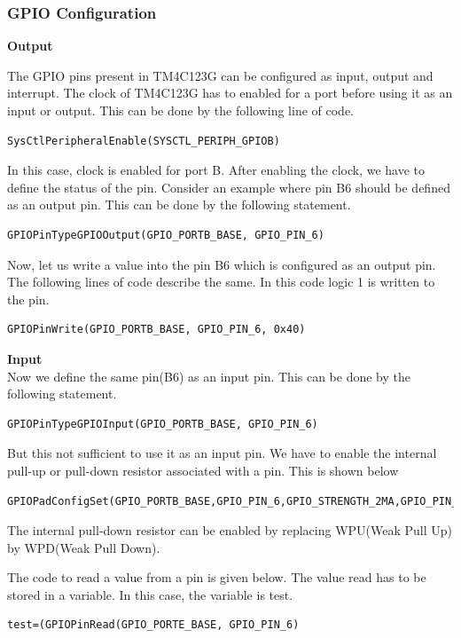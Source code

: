 \documentclass[a4paper,10pt,oneside]{article}
\begin{document}
{			\subsubsection{\textbf{GPIO Configuration}}
				\begin{itemize}
				\item \textbf{Output} \\
				{The GPIO pins present in TM4C123G can be configured as input, output and interrupt. The clock of TM4C123G has to enabled for a port before using it as an input or output. This can be done by the following line of code.
				\begin{lstlisting}[style=CStyle]
					SysCtlPeripheralEnable(SYSCTL_PERIPH_GPIOB)  \end{lstlisting}
				In this case, clock is enabled for port B. After enabling the clock, we have to define the status of the pin. Consider an example where pin B6 should be defined as an output pin. This can be done by the following statement.
				\begin{lstlisting}[style=CStyle]
				GPIOPinTypeGPIOOutput(GPIO_PORTB_BASE, GPIO_PIN_6)  \end{lstlisting}
				
				Now, let us write a value into the pin B6 which is configured as an output pin. The following lines of code describe the same. In this code logic 1 is written to the pin.
				\begin{lstlisting}[style=CStyle]
				GPIOPinWrite(GPIO_PORTB_BASE, GPIO_PIN_6, 0x40) \end{lstlisting}
				\item \textbf{Input}	\\
				Now we define the same pin(B6) as an input pin. This can be done by the following statement. 
				\begin{lstlisting}[style=CStyle]
				GPIOPinTypeGPIOInput(GPIO_PORTB_BASE, GPIO_PIN_6)  \end{lstlisting}
				But this not sufficient to use it as an input pin. We have to enable the internal pull-up or pull-down resistor associated with a pin. This is shown below
								\begin{lstlisting}[style=CStyle]
				GPIOPadConfigSet(GPIO_PORTB_BASE,GPIO_PIN_6,GPIO_STRENGTH_2MA,GPIO_PIN_TYPE_STD_WPU)  \end{lstlisting}
				The internal pull-down resistor can be enabled by replacing WPU(Weak Pull Up) by WPD(Weak Pull Down).
				
				The code to read a value from a pin is given below. The value read has to be stored in a variable. In this case, the variable is test.  
				\begin{lstlisting}[style=CStyle]
					test=(GPIOPinRead(GPIO_PORTE_BASE, GPIO_PIN_6)\end{lstlisting}
				}
			\end{itemize}		
}
\end{document}
